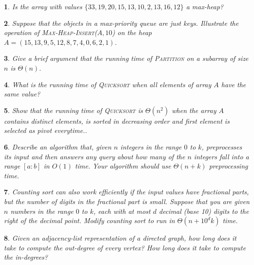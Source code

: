 \documentclass[%
addpoints]{exam}
\theoremstyle{problem}
\newtheorem{p}{}
\begin{document}
\begin{p} 
Is the array with values \( \{33, 19, 20, 15, 13, 10, 2, 13, 16, 12\} \) a max-heap?  
\hfill  
\end{p}

\begin{p} 
Suppose that the objects in a max-priority queue are just keys. Illustrate the operation of \textsc{Max-Heap-Insert}(\( A, 10 \)) on the heap \( A = (15, 13, 9, 5, 12, 8, 7, 4, 0, 6, 2, 1) \).  
\hfill  
\end{p}


\begin{p} 
Give a brief argument that the running time of \textsc{Partition} on a subarray of size \( n \) is \( \Theta(n) \).  
\hfill  
\end{p}

\begin{p} 
What is the running time of \textsc{Quicksort} when all elements of array \( A \) have the same value?  
\hfill  
\end{p}

\begin{p} 
Show that the running time of \textsc{Quicksort} is \( \Theta(n^2) \) when the array \( A \) contains distinct elements, is sorted in decreasing order and first element is selected as pivot everytime..  
\hfill  
\end{p}


\begin{p} 
Describe an algorithm that, given \( n \) integers in the range \( 0 \) to \( k \), preprocesses its input and then answers any query about how many of the \( n \) integers fall into a range \([a:b]\) in \( O(1) \) time. Your algorithm should use \( \Theta(n + k) \) preprocessing time.  
\hfill  
\end{p}

\begin{p} 
Counting sort can also work efficiently if the input values have fractional parts, but the number of digits in the fractional part is small. Suppose that you are given \( n \) numbers in the range \( 0 \) to \( k \), each with at most \( d \) decimal (base 10) digits to the right of the decimal point. Modify counting sort to run in \( \Theta(n + 10^d k) \) time.  
\hfill  
\end{p}

\begin{p} 
Given an adjacency-list representation of a directed graph, how long does it take to compute the out-degree of every vertex? How long does it take to compute the in-degrees?  
\hfill  
\end{p}
\end{document}
